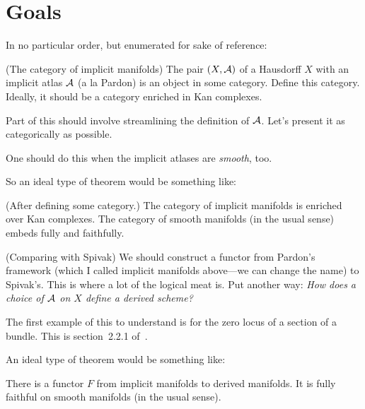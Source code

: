  

\section{Goals}
In no particular order, but enumerated for sake of reference:
\enum
	\item (The category of implicit manifolds)
		The pair $(X, \mathcal A)$ of a Hausdorff $X$ with an implicit atlas $\mathcal A$ (a la Pardon) is an object in some category. Define this category. Ideally, it should be a category enriched in Kan complexes.
			\enum
				\item
					Part of this should involve streamlining the definition of $\mathcal A$. Let's present it as categorically as possible.
				\item
					One should do this when the implicit atlases are {\em smooth}, too.
				\item
					So an ideal type of theorem would be something like:
						\begin{theorem}
						(After defining some category.) The category of implicit manifolds is enriched over Kan complexes. The category of smooth manifolds (in the usual sense) embeds fully and faithfully.
						\end{theorem}
			\enumd
	\item (Comparing with Spivak)
		We should construct a functor from Pardon's framework (which I called implicit manifolds above---we can change the name) to Spivak's. This is where a lot of the logical meat is. Put another way: {\em How does a choice of $\mathcal A$ on $X$ define a derived scheme?}
			\enum
				\item
					The first example of this to understand is for the zero locus of a section of a bundle. This is section~2.2.1 of~\cite{pardon}.
				\item
					An ideal type of theorem would be something like:
						\begin{theorem}
						There is a functor $F$ from implicit manifolds to derived manifolds. It is fully faithful on smooth manifolds (in the usual sense).
						\end{theorem}
